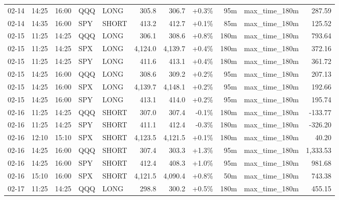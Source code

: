 \documentclass[11pt,a4paper,twoside]{article}
\begin{document}
\begin{center}
\begin{longtable}{>{\color{txtmain}}l l l l l r r r r >{\color{txtmain}}l r}
02-14 & 14:25 & 16:00 & QQQ & LONG & 305.8 & 306.7 & \textcolor{wingreen}{+0.3\%} & 95m & max\_time\_180m & \textcolor{wingreen}{287.59} \\
02-14 & 14:35 & 16:00 & SPY & SHORT & 413.2 & 412.7 & \textcolor{wingreen}{+0.1\%} & 85m & max\_time\_180m & \textcolor{wingreen}{125.52} \\
02-15 & 11:25 & 14:25 & QQQ & LONG & 306.1 & 308.6 & \textcolor{wingreen}{+0.8\%} & 180m & max\_time\_180m & \textcolor{wingreen}{793.64} \\
02-15 & 11:25 & 14:25 & SPX & LONG & 4,124.0 & 4,139.7 & \textcolor{wingreen}{+0.4\%} & 180m & max\_time\_180m & \textcolor{wingreen}{372.16} \\
02-15 & 11:25 & 14:25 & SPY & LONG & 411.6 & 413.1 & \textcolor{wingreen}{+0.4\%} & 180m & max\_time\_180m & \textcolor{wingreen}{361.72} \\
02-15 & 14:25 & 16:00 & QQQ & LONG & 308.6 & 309.2 & \textcolor{wingreen}{+0.2\%} & 95m & max\_time\_180m & \textcolor{wingreen}{207.13} \\
02-15 & 14:25 & 16:00 & SPX & LONG & 4,139.7 & 4,148.1 & \textcolor{wingreen}{+0.2\%} & 95m & max\_time\_180m & \textcolor{wingreen}{192.66} \\
02-15 & 14:25 & 16:00 & SPY & LONG & 413.1 & 414.0 & \textcolor{wingreen}{+0.2\%} & 95m & max\_time\_180m & \textcolor{wingreen}{195.74} \\
02-16 & 11:25 & 14:25 & QQQ & SHORT & 307.0 & 307.4 & \textcolor{lossred}{-0.1\%} & 180m & max\_time\_180m & \textcolor{lossred}{-133.77} \\
02-16 & 11:25 & 14:25 & SPY & SHORT & 411.1 & 412.4 & \textcolor{lossred}{-0.3\%} & 180m & max\_time\_180m & \textcolor{lossred}{-326.20} \\
02-16 & 12:10 & 15:10 & SPX & SHORT & 4,123.5 & 4,121.5 & \textcolor{wingreen}{+0.1\%} & 180m & max\_time\_180m & \textcolor{wingreen}{40.20} \\
02-16 & 14:25 & 16:00 & QQQ & SHORT & 307.4 & 303.3 & \textcolor{wingreen}{+1.3\%} & 95m & max\_time\_180m & \textcolor{wingreen}{1,333.53} \\
02-16 & 14:25 & 16:00 & SPY & SHORT & 412.4 & 408.3 & \textcolor{wingreen}{+1.0\%} & 95m & max\_time\_180m & \textcolor{wingreen}{981.68} \\
02-16 & 15:10 & 16:00 & SPX & SHORT & 4,121.5 & 4,090.4 & \textcolor{wingreen}{+0.8\%} & 50m & max\_time\_180m & \textcolor{wingreen}{743.38} \\
02-17 & 11:25 & 14:25 & QQQ & LONG & 298.8 & 300.2 & \textcolor{wingreen}{+0.5\%} & 180m & max\_time\_180m & \textcolor{wingreen}{455.15} \\

\end{longtable}
\end{center}
\end{document}
